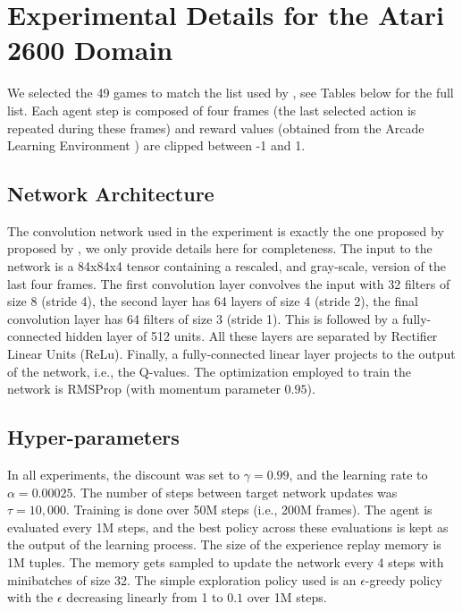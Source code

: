 \documentclass[letterpaper]{article}
\begin{document}
\section*{Experimental Details for the Atari 2600 Domain}

We selected the 49 games to match the list used by \citet{Mnih:2015}, see Tables below for the full list. Each agent step is composed of four frames (the last selected action is repeated during these frames) and reward values (obtained from the Arcade Learning Environment \citep{Bellemare:2013}) are clipped between -1 and 1. 

\subsection*{Network Architecture}

The convolution network used in the experiment is exactly the one proposed by proposed by \citet{Mnih:2015}, we only provide details here for completeness. The input to the network is a 84x84x4 tensor containing a rescaled, and gray-scale, version of the last four frames. The first convolution layer convolves the input with 32 filters of size 8 (stride 4), the second layer has 64 layers of size 4 (stride 2), the final convolution layer has 64 filters of size 3 (stride 1). 
This is followed by a fully-connected hidden layer of 512 units.
All these layers are separated by Rectifier Linear Units (ReLu). Finally, a fully-connected linear layer projects to the output of the network, i.e., the Q-values.
The optimization employed to train the network is RMSProp (with momentum parameter $0.95$). 

\subsection*{Hyper-parameters}

In all experiments, the discount was set to $\gamma=0.99$, and the learning rate to $\alpha=0.00025$. 
The number of steps between target network updates was $\tau=10,000$. Training is done over 50M steps (i.e., 200M frames). The agent is evaluated every 1M steps, and the best policy across these evaluations is kept as the output of the learning process. 
The size of the experience replay memory is 1M tuples. The memory gets sampled to update the network every 4 steps with minibatches of size 32.
The simple exploration policy used is an $\epsilon$-greedy policy with the $\epsilon$ decreasing linearly from 1 to $0.1$ over 1M steps.
\end{document}

